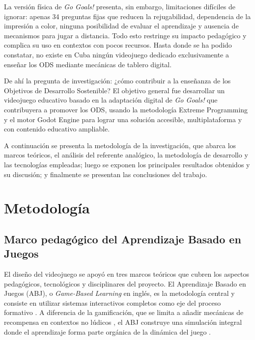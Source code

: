 \documentclass[12pt,a4paper]{article}
\begin{document}
La versión física de \textit{Go Goals!} presenta, sin embargo, limitaciones difíciles de ignorar: apenas 34 preguntas fijas que reducen la rejugabilidad, dependencia de la impresión a color, ninguna posibilidad de evaluar el aprendizaje y ausencia de mecanismos para jugar a distancia. Todo esto restringe su impacto pedagógico y complica su uso en contextos con pocos recursos. Hasta donde se ha podido constatar, no existe en Cuba ningún videojuego dedicado exclusivamente a enseñar los ODS mediante mecánicas de tablero digital.

De ahí la pregunta de investigación: ¿cómo contribuir a la enseñanza de los Objetivos de Desarrollo Sostenible? El objetivo general fue desarrollar un videojuego educativo basado en la adaptación digital de \textit{Go Goals!} que contribuyera a promover los ODS, usando la metodología Extreme Programming y el motor Godot Engine para lograr una solución accesible, multiplataforma y con contenido educativo ampliable.

\vspace{0.3cm}

A continuación se presenta la metodología de la investigación, que abarca los marcos teóricos, el análisis del referente analógico, la metodología de desarrollo y las tecnologías empleadas; luego se exponen los principales resultados obtenidos y su discusión; y finalmente se presentan las conclusiones del trabajo.

\section{Metodología}

\subsection{Marco pedagógico del Aprendizaje Basado en Juegos}

El diseño del videojuego se apoyó en tres marcos teóricos que cubren los aspectos pedagógicos, tecnológicos y disciplinares del proyecto. El Aprendizaje Basado en Juegos (ABJ), o \textit{Game-Based Learning} en inglés, es la metodología central y consiste en utilizar sistemas interactivos completos como eje del proceso formativo \citep{PlassHomer2020}. A diferencia de la gamificación, que se limita a añadir mecánicas de recompensa en contextos no lúdicos \citep{Mabalay2025}, el ABJ construye una simulación integral donde el aprendizaje forma parte orgánica de la dinámica del juego \citep{AguileraRoock2022}.
\end{document}
